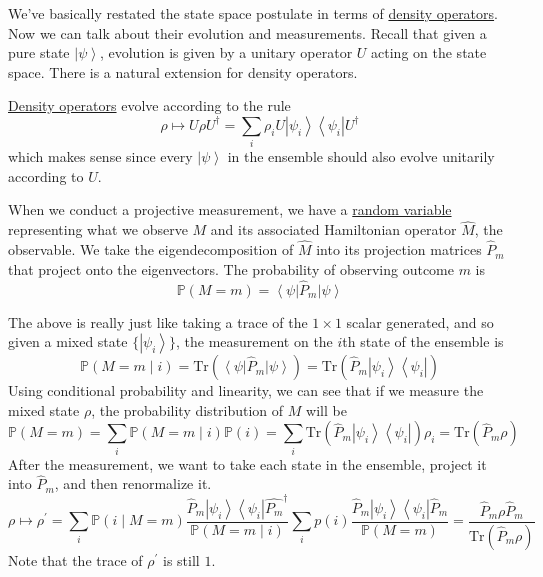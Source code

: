 \documentclass{article}
\newcommand{\ket}[1]{\ensuremath{\left|#1\right\rangle}}
\newcommand{\bra}[1]{\ensuremath{\left\langle#1\right|}}
\begin{document}
    We've basically restated the state space postulate in terms of \hyperref[def:density-operator]{density operators}. Now we can talk about their evolution and measurements. Recall that given a pure state $\ket{\psi}$, evolution is given by a unitary operator $U$ acting on the state space. There is a natural extension for density operators. 

    \begin{lemma}
      \label{thm:evolution-of-density-operators}
      \hyperref[def:density-operator]{Density operators} evolve according to the rule 
      \begin{equation} 
        \rho \mapsto U \rho U^\dagger = \sum_i \rho_i U \ket{\psi_i} \bra{\psi_i} U^\dagger
      \end{equation}
      which makes sense since every $\ket{\psi}$ in the ensemble should also evolve unitarily according to $U$. 
    \end{lemma}

    When we conduct a projective measurement, we have a \hyperref[prob-def:random-variable]{random variable} representing what we observe $M$ and its associated Hamiltonian operator $\hat{M}$, the observable. We take the eigendecomposition of $\hat{M}$ into its projection matrices $\hat{P}_m$ that project onto the eigenvectors. The probability of observing outcome $m$ is 
    \begin{equation}
      \mathbb{P}(M = m) = \bra{\psi} \hat{P}_m \ket{\psi} 
    \end{equation}

    \begin{lemma}
      \label{thm:measurement-of-density-operators}
      The above is really just like taking a trace of the $1 \times 1$ scalar generated, and so given a mixed state $\{ \ket{\psi_i}\}$, the measurement on the $i$th state of the ensemble is 
      \begin{equation}
        \mathbb{P}(M = m \mid i) = \mathrm{Tr}(\bra{\psi} \hat{P}_m \ket{\psi}) = \mathrm{Tr}( \hat{P}_m \ket{\psi_i} \bra{\psi_i}) 
      \end{equation}
      Using conditional probability and linearity, we can see that if we measure the mixed state $\rho$, the probability distribution of $M$ will be 
      \begin{equation}
        \mathbb{P}(M = m) = \sum_i \mathbb{P}(M = m \mid i) \mathbb{P}(i) = \sum_i \mathrm{Tr}(\hat{P}_m \ket{\psi_i} \bra{\psi_i}) \rho_i = \mathrm{Tr}(\hat{P}_m \rho) 
      \end{equation}
      After the measurement, we want to take each state in the ensemble, project it into $\hat{P}_m$, and then renormalize it. 
      \begin{equation}
        \rho \mapsto \rho^\prime = \sum_i \mathbb{P}(i \mid M = m) \frac{\hat{P}_m \ket{\psi_i} \bra{\psi_i} \hat{P_m}^\dagger}{\mathbb{P}(M = m \mid i)} \sum_i p(i) \frac{\hat{P}_m \ket{\psi_i} \bra{\psi_i} \hat{P}_m}{\mathbb{P}(M = m)} = \frac{\hat{P}_m \rho \hat{P}_m}{\mathrm{Tr}(\hat{P}_m \rho)} 
      \end{equation}
      Note that the trace of $\rho^\prime$ is still $1$. 
    \end{lemma}
\end{document}
